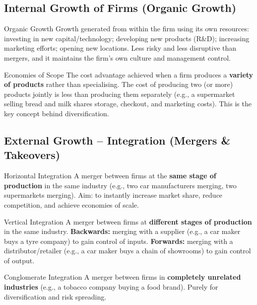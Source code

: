 \documentclass[11pt, a4paper, twoside]{book}
\begin{document}
\subsection{Internal Growth of Firms (Organic Growth)}

\begin{keyterm}{Organic Growth}
Growth generated from within the firm using its own resources: investing in new capital/technology; developing new products (R\&D); increasing marketing efforts; opening new locations. Less risky and less disruptive than mergers, and it maintains the firm's own culture and management control.
\end{keyterm}

\begin{keyterm}{Economies of Scope}
The cost advantage achieved when a firm produces a \textbf{variety of products} rather than specialising. The cost of producing two (or more) products jointly is less than producing them separately (e.g., a supermarket selling bread and milk shares storage, checkout, and marketing costs). This is the key concept behind diversification.
\end{keyterm}

\subsection{External Growth -- Integration (Mergers \& Takeovers)}

\begin{keyterm}{Horizontal Integration}
A merger between firms at the \textbf{same stage of production} in the same industry (e.g., two car manufacturers merging, two supermarkets merging). Aim: to instantly increase market share, reduce competition, and achieve economies of scale.
\end{keyterm}

\begin{keyterm}{Vertical Integration}
A merger between firms at \textbf{different stages of production} in the same industry. \textbf{Backwards:} merging with a supplier (e.g., a car maker buys a tyre company) to gain control of inputs. \textbf{Forwards:} merging with a distributor/retailer (e.g., a car maker buys a chain of showrooms) to gain control of output.
\end{keyterm}

\begin{keyterm}{Conglomerate Integration}
A merger between firms in \textbf{completely unrelated industries} (e.g., a tobacco company buying a food brand). Purely for diversification and risk spreading.
\end{keyterm}
\end{document}
